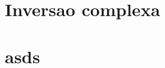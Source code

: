 \documentclass[12pt,twoside, a4paper, twocolumn]{article}
\newcommand{\drawvector} [9] [color=cyan] {
    \draw[line width=1.5pt,#1,-stealth](axis cs: #2, #3)--(axis cs: #4, #5) node[anchor=south west]{$#6$};

    

\ifthenelse{\equal{#7}{true}}{
    \draw[line width=1pt,#1, dashed](axis cs: #4, #5)--(axis cs: #4, 0) node[anchor= north west]{$#8$};
    \draw[line width=1pt,#1, dashed](axis cs: #4, #5)--(axis cs: 0, #5) node[anchor=south east]{$#9$};
    }
    {}
}
\begin{document}

%  







\section{Inversao complexa}

\section{asds}
\end{document}
